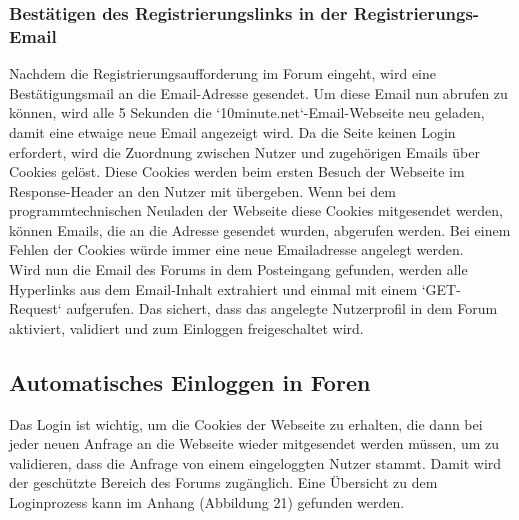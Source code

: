 \subsubsection{Bestätigen des Registrierungslinks in der Registrierungs-Email}
Nachdem die Registrierungsaufforderung im Forum eingeht, wird eine Bestätigungsmail an die Email-Adresse gesendet.
Um diese Email nun abrufen zu können, wird alle 5 Sekunden die `10minute.net`-Email-Webseite neu geladen, damit eine etwaige neue Email angezeigt wird. Da die Seite keinen Login erfordert, wird die Zuordnung zwischen Nutzer und zugehörigen Emails über Cookies gelöst. Diese Cookies werden beim ersten Besuch der Webseite im Response-Header an den Nutzer mit übergeben. Wenn bei dem programmtechnischen Neuladen der Webseite diese Cookies mitgesendet werden, können Emails, die an die Adresse gesendet wurden, abgerufen werden. Bei einem Fehlen der Cookies würde immer eine neue Emailadresse angelegt werden.\\
Wird nun die Email des Forums in dem Posteingang gefunden, werden alle Hyperlinks aus dem Email-Inhalt extrahiert und einmal mit einem `GET-Request` aufgerufen. Das sichert, dass das angelegte Nutzerprofil in dem Forum aktiviert, validiert und zum Einloggen freigeschaltet wird.


\subsection {Automatisches Einloggen in Foren}
Das Login ist wichtig, um die Cookies der Webseite zu erhalten, die dann bei jeder neuen Anfrage an die Webseite wieder mitgesendet werden müssen, um zu validieren, dass die Anfrage von einem eingeloggten Nutzer stammt. Damit wird der geschützte Bereich des Forums zugänglich.
Eine Übersicht zu dem Loginprozess kann im Anhang (Abbildung 21) gefunden werden.

